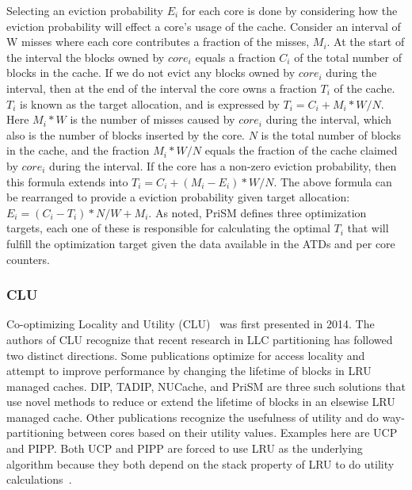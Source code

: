 Selecting an eviction probability $E_i$ for each core is done by considering how the eviction probability will effect a core's usage of the cache.
Consider an interval of W misses where each core contributes a fraction of the misses, $M_i$.
At the start of the interval the blocks owned by $core_i$ equals a fraction $C_i$ of the total number of blocks in the cache.
If we do not evict any blocks owned by $core_i$ during the interval, then at the end of the interval the core owns a fraction $T_i$ of the cache.
$T_i$ is known as the target allocation, and is expressed by $T_i = C_i + M_i * W/N$. 
Here $M_i * W$ is the number of misses caused by $core_i$ during the interval, which also is the number of blocks inserted by the core.
$N$ is the total number of blocks in the cache, and the fraction $M_i * W/N$ equals the fraction of the cache claimed by $core_i$ during the interval.
If the core has a non-zero eviction probability, then this formula extends into $T_i = C_i + (M_i - E_i) * W/N$.
The above formula can be rearranged to provide a eviction probability given target allocation: $E_i = (C_i - T_i) * N/W + M_i$.
As noted, PriSM defines three optimization targets, each one of these is responsible for calculating the optimal $T_i$ that will fulfill the optimization target given the data available in the ATDs and per core counters.

\subsubsection{CLU}

Co-optimizing Locality and Utility (CLU)~\cite{Zhan2014} was first presented in 2014.
The authors of CLU recognize that recent research in LLC partitioning has followed two distinct directions.
Some publications optimize for access locality and attempt to improve performance by changing the lifetime of blocks in LRU managed caches.
DIP, TADIP, NUCache, and PriSM are three such solutions that use novel methods to reduce or extend the lifetime of blocks in an elsewise LRU managed cache.
Other publications recognize the usefulness of utility and do way-partitioning between cores based on their utility values.
Examples here are UCP and PIPP.
Both UCP and PIPP are forced to use LRU as the underlying algorithm because they both depend on the stack property of LRU to do utility calculations~\cite{Qureshi2006, Xie2009}.

